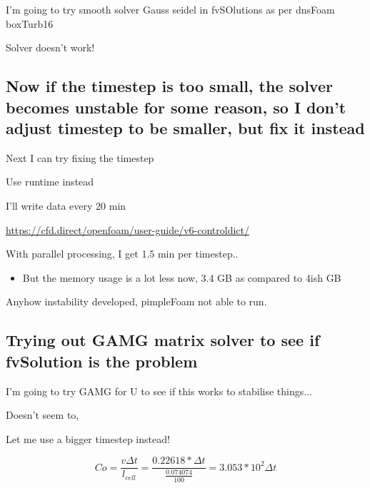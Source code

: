 \documentclass[12pt]{article}
\renewcommand{\_}{\kern-1.5pt\textunderscore\kern-1.5pt}
\begin{document}
I’m going to try smooth solver Gauss seidel in fvSOlutions as per dnsFoam boxTurb16\par

Solver doesn’t work! \par

\subsection{Now if the timestep is too small, the solver becomes unstable for some reason, so I don’t adjust timestep to be smaller, but fix it instead}\par

Next I can try fixing the timestep\par

Use runtime instead\par

I’ll write data every 20 min\par

\href{https://cfd.direct/openfoam/user-guide/v6-controldict/}{https://cfd.direct/openfoam/user-guide/v6-controldict/}\par


\vspace{\baselineskip}
With parallel processing, I get 1.5 min per timestep..\par
\begin{itemize}
	\item But the memory usage is a lot less now, 3.4 GB as compared to 4ish GB
\end{itemize}\par

Anyhow instability developed, pimpleFoam not able to run.\par

\subsection{Trying out GAMG matrix solver to see if fvSolution is the problem}\par

I’m going to try GAMG for U to see if this works to stabilise things$ \ldots $ \par

Doesn’t seem to, \par

Let me use a bigger timestep instead!\par

 \[ Co=\frac{v \Delta t}{l_{cell}}=\frac{0.22618\ast \Delta t}{\frac{0.074074}{100}}=3.053\ast10^{2} \Delta t \] \par
\end{document}
